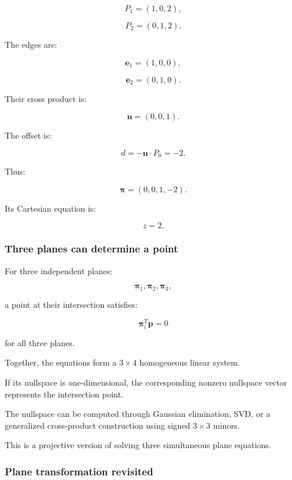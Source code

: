 \[
 P_1=(1,0,2),
\]

\[
 P_2=(0,1,2).
\]

The edges are:

\[
 \mathbf e_1=(1,0,0),
\]

\[
 \mathbf e_2=(0,1,0).
\]

Their cross product is:

\[
 \mathbf n=(0,0,1).
\]

The offset is:

\[
 d=-\mathbf n\cdot P_0=-2.
\]

Thus:

\[
 \boxed{ \boldsymbol\pi=(0,0,1,-2) }.
\]

Its Cartesian equation is:

\[
 \boxed{z=2}.
\]

\subsubsection{Three planes can determine a point}\label{02-foundations-ii-ch032-three-planes-can-determine-a-point}

\hypertarget{02-foundations-ii-ch032-three-planes-can-determine-a-point}{}

For three independent planes:

\[
 \boldsymbol\pi_1,\boldsymbol\pi_2,\boldsymbol\pi_3,
\]

a point at their intersection satisfies:

\[
 \boldsymbol\pi_i^T\mathbf p=0
\]

for all three planes.

Together, the equations form a \(3\times4\) homogeneous linear system.

If its nullspace is one-dimensional, the corresponding nonzero nullspace vector represents the intersection point.

The nullspace can be computed through Gaussian elimination, SVD, or a generalized cross-product construction using signed \(3\times3\) minors.

This is a projective version of solving three simultaneous plane equations.

\subsubsection{Plane transformation revisited}\label{02-foundations-ii-ch032-plane-transformation-revisited}

\hypertarget{02-foundations-ii-ch032-plane-transformation-revisited}{}

